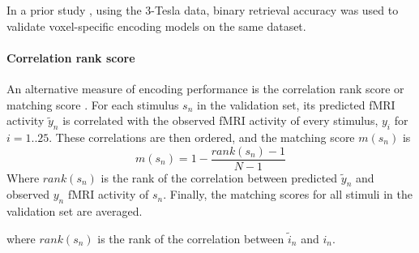 In a prior study \citep{CTK+2012}, using the 3-Tesla data, binary retrieval
accuracy was used to validate voxel-specific encoding models on the same
dataset.

\paragraph{Correlation rank score}
%
An alternative measure of encoding performance is the correlation rank score or
matching score \citep{SF14}. For each stimulus $s_{n}$ in the validation set,
its predicted f{MRI} activity $\widetilde{y}_{n}$ is correlated with the
observed f{MRI} activity of every stimulus, $y_{i}$ for $i=1..25$. These
correlations are then ordered, and the  matching score $m(s_{n})$ is \[
m(s_{n}) = 1-\frac{rank(s_{n})-1}{N-1} \] Where $rank(s_{n})$ is the rank of
the correlation between predicted $\widetilde{y}_{n}$ and observed $y_{n}$
f{MRI} activity of $s_{n}$. Finally, the matching scores for all stimuli in the
validation set are averaged.

where $rank(s_{n})$ is the rank of the correlation between $\widetilde{i}_{n}$
and $i_{n}$.

